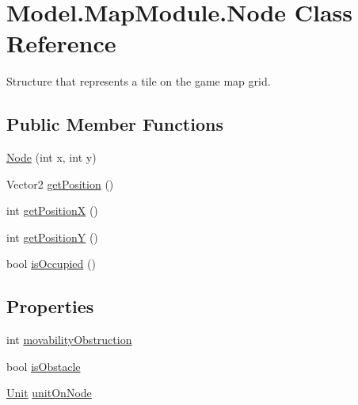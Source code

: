 \hypertarget{class_model_1_1_map_module_1_1_node}{}\section{Model.\+Map\+Module.\+Node Class Reference}
\label{class_model_1_1_map_module_1_1_node}


Structure that represents a tile on the game map grid.  


\subsection*{Public Member Functions}
\begin{DoxyCompactItemize}
\item 
\hyperlink{class_model_1_1_map_module_1_1_node_a519d0765e3b91e7e19c1aa0db44696d9}{Node} (int x, int y)
\item 
Vector2 \hyperlink{class_model_1_1_map_module_1_1_node_ac584afe840f0eccf88221ba551b47e3a}{get\+Position} ()
\item 
int \hyperlink{class_model_1_1_map_module_1_1_node_aafda1d229261c9bb17d16bf3f33f8362}{get\+PositionX} ()
\item 
int \hyperlink{class_model_1_1_map_module_1_1_node_a6c0463ae7d2efde9eab77d67b520bce4}{get\+PositionY} ()
\item 
bool \hyperlink{class_model_1_1_map_module_1_1_node_a1f48521054f542a83331e7d35b1340bb}{is\+Occupied} ()
\end{DoxyCompactItemize}
\subsection*{Properties}
\begin{DoxyCompactItemize}
\item 
int \hyperlink{class_model_1_1_map_module_1_1_node_a73c035dbce10c987f99e1d99a8abf928}{movability\+Obstruction}
\item 
bool \hyperlink{class_model_1_1_map_module_1_1_node_adebdc4bf4bee0c34caadc3d8cc9e1d35}{is\+Obstacle}
\item 
\hyperlink{interface_model_1_1_unit_module_1_1_unit}{Unit} \hyperlink{class_model_1_1_map_module_1_1_node_a0998a1b014ec056f419e0510ec8c0e26}{unit\+On\+Node}
\end{DoxyCompactItemize}


